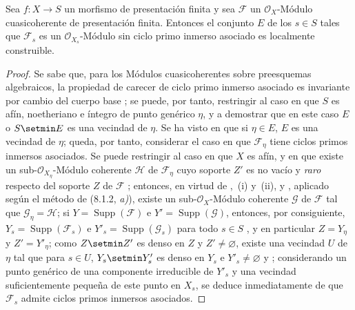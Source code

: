 \begin{proposition}[9.8.1]
\label{IV.9.8.1}
Sea $f:X\to S$ un morfismo de presentación finita y sea $\mathcal F$ un $\mathcal O_X$-Módulo cuasicoherente de presentación finita.
Entonces el conjunto $E$ de los $s\in S$ tales que $\mathcal F_s$ es un $\mathcal O_{X_s}$-Módulo sin ciclo primo inmerso asociado es localmente construible.
\end{proposition}

\begin{proof}
\label{IV.9.8.1-proof}
Se sabe que, para los Módulos cuasicoherentes sobre preesquemas algebraicos, la propiedad de carecer de ciclo primo inmerso asociado es invariante por cambio del cuerpo base ; se puede, por tanto, restringir al caso en que $S$ es afín, noetheriano e íntegro de punto genérico $\eta$, y a demostrar que en este caso $E$ o $S\setmin E$ es una vecindad de $\eta$.
Se ha visto en  que si $\eta\in E$, $E$ es una vecindad de $\eta$; queda, por tanto, considerar el caso en que $\mathcal F_\eta$ tiene ciclos primos inmersos asociados.
Se puede restringir al caso en que $X$ es afín, y en que existe un sub-$\mathcal O_{X_\eta}$-Módulo coherente $\mathcal H$ de $\mathcal F_\eta$ cuyo soporte $Z'$ es no vacío y \emph{raro} respecto del soporte $Z$ de $\mathcal F$ ; entonces, en virtud de ,~(i) y~(ii),
y , aplicado según el método de (8.1.2, \emph{a)}), existe un sub-$\mathcal O_X$-Módulo coherente $\mathcal G$ de $\mathcal F$ tal que $\mathcal G_\eta=\mathcal H$; si $Y=\operatorname{Supp}(\mathcal F)$ e $Y'=\operatorname{Supp}(\mathcal G)$, entonces, por consiguiente, $Y_s=\operatorname{Supp}(\mathcal F_s)$ e $Y'_s=\operatorname{Supp}(\mathcal G_s)$ para todo $s\in S$ , y en particular $Z=Y_\eta$ y $Z'=Y'_\eta$; como $Z\setmin Z'$ es denso en $Z$ y $Z'\neq\varnothing$, existe una vecindad $U$ de $\eta$ tal que para $s\in U$, $Y_s\setmin Y'_s$ es denso en $Y_s$ e $Y'_s\neq\varnothing$  y ; considerando un punto genérico de una componente irreducible de $Y'_s$ y una vecindad suficientemente pequeña de este punto en $X_s$, se deduce inmediatamente de  que $\mathcal F_s$ admite ciclos primos inmersos asociados.
\end{proof}

